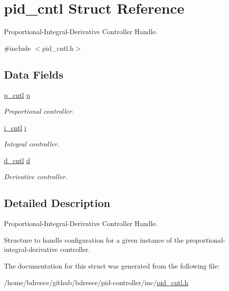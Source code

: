 \hypertarget{structpid__cntl}{}\section{pid\+\_\+cntl Struct Reference}
\label{structpid__cntl}


Proportional-\/\+Integral-\/\+Derivative Controller Handle.  




{\ttfamily \#include $<$pid\+\_\+cntl.\+h$>$}

\subsection*{Data Fields}
\begin{DoxyCompactItemize}
\item 
\mbox{\label{structpid__cntl_a2c76075960f5ef516f3a8b7ae9bc07de}} 
\hyperlink{structp__cntl}{p\+\_\+cntl} \hyperlink{structpid__cntl_a2c76075960f5ef516f3a8b7ae9bc07de}{p}
\begin{DoxyCompactList}\small\item\em Proportional controller. \end{DoxyCompactList}\item 
\mbox{\label{structpid__cntl_a2a7f9317631c881819f3e954fa57fe81}} 
\hyperlink{structi__cntl}{i\+\_\+cntl} \hyperlink{structpid__cntl_a2a7f9317631c881819f3e954fa57fe81}{i}
\begin{DoxyCompactList}\small\item\em Integral controller. \end{DoxyCompactList}\item 
\mbox{\label{structpid__cntl_a3b81a2ff88d683cd0b68df5dd3b2758c}} 
\hyperlink{structd__cntl}{d\+\_\+cntl} \hyperlink{structpid__cntl_a3b81a2ff88d683cd0b68df5dd3b2758c}{d}
\begin{DoxyCompactList}\small\item\em Derivative controller. \end{DoxyCompactList}\end{DoxyCompactItemize}


\subsection{Detailed Description}
Proportional-\/\+Integral-\/\+Derivative Controller Handle. 

Structure to handle configuration for a given instance of the proportional-\/integral-\/derivative controller. 

The documentation for this struct was generated from the following file\+:\begin{DoxyCompactItemize}
\item 
/home/bdreece/github/bdreece/pid-\/controller/inc/\hyperlink{pid__cntl_8h}{pid\+\_\+cntl.\+h}\end{DoxyCompactItemize}
